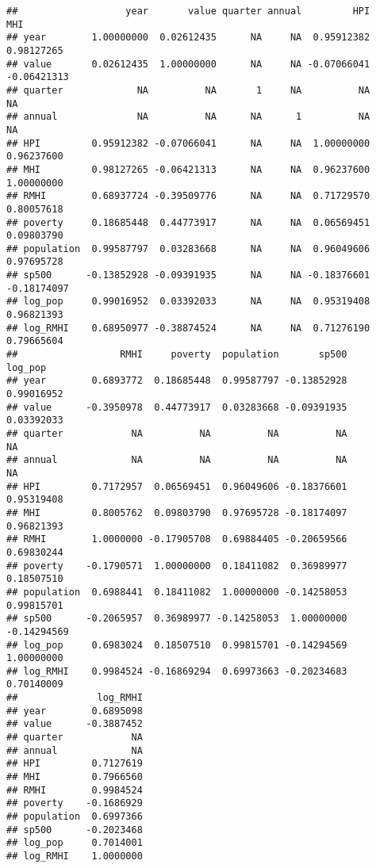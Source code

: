 \documentclass[
]{article}
\newenvironment{Shaded}{\begin{snugshade}}{\end{snugshade}}
\newcommand{\DataTypeTok}[1]{\textcolor[rgb]{0.13,0.29,0.53}{#1}}
\newcommand{\DecValTok}[1]{\textcolor[rgb]{0.00,0.00,0.81}{#1}}
\newcommand{\KeywordTok}[1]{\textcolor[rgb]{0.13,0.29,0.53}{\textbf{#1}}}
\newcommand{\NormalTok}[1]{#1}
\newcommand{\OperatorTok}[1]{\textcolor[rgb]{0.81,0.36,0.00}{\textbf{#1}}}
\newcommand{\StringTok}[1]{\textcolor[rgb]{0.31,0.60,0.02}{#1}}
\begin{document}
\begin{verbatim}
##                   year       value quarter annual         HPI         MHI
## year        1.00000000  0.02612435      NA     NA  0.95912382  0.98127265
## value       0.02612435  1.00000000      NA     NA -0.07066041 -0.06421313
## quarter             NA          NA       1     NA          NA          NA
## annual              NA          NA      NA      1          NA          NA
## HPI         0.95912382 -0.07066041      NA     NA  1.00000000  0.96237600
## MHI         0.98127265 -0.06421313      NA     NA  0.96237600  1.00000000
## RMHI        0.68937724 -0.39509776      NA     NA  0.71729570  0.80057618
## poverty     0.18685448  0.44773917      NA     NA  0.06569451  0.09803790
## population  0.99587797  0.03283668      NA     NA  0.96049606  0.97695728
## sp500      -0.13852928 -0.09391935      NA     NA -0.18376601 -0.18174097
## log_pop     0.99016952  0.03392033      NA     NA  0.95319408  0.96821393
## log_RMHI    0.68950977 -0.38874524      NA     NA  0.71276190  0.79665604
##                  RMHI     poverty  population       sp500     log_pop
## year        0.6893772  0.18685448  0.99587797 -0.13852928  0.99016952
## value      -0.3950978  0.44773917  0.03283668 -0.09391935  0.03392033
## quarter            NA          NA          NA          NA          NA
## annual             NA          NA          NA          NA          NA
## HPI         0.7172957  0.06569451  0.96049606 -0.18376601  0.95319408
## MHI         0.8005762  0.09803790  0.97695728 -0.18174097  0.96821393
## RMHI        1.0000000 -0.17905708  0.69884405 -0.20659566  0.69830244
## poverty    -0.1790571  1.00000000  0.18411082  0.36989977  0.18507510
## population  0.6988441  0.18411082  1.00000000 -0.14258053  0.99815701
## sp500      -0.2065957  0.36989977 -0.14258053  1.00000000 -0.14294569
## log_pop     0.6983024  0.18507510  0.99815701 -0.14294569  1.00000000
## log_RMHI    0.9984524 -0.16869294  0.69973663 -0.20234683  0.70140009
##              log_RMHI
## year        0.6895098
## value      -0.3887452
## quarter            NA
## annual             NA
## HPI         0.7127619
## MHI         0.7966560
## RMHI        0.9984524
## poverty    -0.1686929
## population  0.6997366
## sp500      -0.2023468
## log_pop     0.7014001
## log_RMHI    1.0000000
\end{verbatim}

\begin{Shaded}
\end{Shaded}
\end{document}
